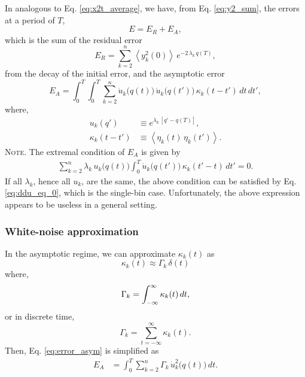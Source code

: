 \documentclass[reprint, floatfix]{revtex4-1}
\newcommand{\note}[1]{{\color{DarkGreen}\footnotesize \textsc{Note.} #1}}
\newcommand{\Err}{E}
\begin{document}
In analogous to Eq. \eqref{eq:x2t_average},
we have, from Eq. \eqref{eq:y2_sum},
the errors at a period of $T$,
%
\begin{equation}
  \Err
  =
  \Err_R + \Err_A,
  \label{eq:error_split}
\end{equation}
%
which is the sum of the residual error
%
\begin{equation}
  \Err_R
  =
  \sum_{k = 2}^n
    \left\langle y_k^2(0) \right\rangle \,
    e^{ - 2 \, \lambda_k  \, q(T) },
  \label{eq:error_res}
\end{equation}
%
from the decay of the initial error,
and the asymptotic error
\begin{equation}
  \Err_A
  =
  \int_0^T \int_0^T
  \sum_{k = 2}^n
    \dot u_k\bigl( q(t) \bigr) \,
    \dot u_k\bigl( q(t') \bigr) \,
    \kappa_k(t - t') \, dt \, dt',
  \label{eq:error_asym}
\end{equation}
%
where,
\begin{align*}
  u_k(q')
  &\equiv
  e^{\lambda_k \, [q' - q(T)]},
  \\
  \kappa_k(t - t')
  &\equiv
  \left\langle
    \eta_k(t) \, \eta_k(t')
  \right\rangle.
\end{align*}
%
\note{The extremal condition of $\Err_A$ is given by
%
\begin{align}
\sum_{k = 2}^n
\lambda_k \, u_k\bigl( q(t) \bigr)
\int_0^T
  \ddot u_k \bigl( q(t') \bigr) \,
  \kappa_k(t' - t) \, dt' = 0.
\label{eq:optimal_mbin}
\end{align}
%
If all $\lambda_k$, hence all $u_k$, are the same,
the above condition can be satisfied
by Eq. \eqref{eq:ddu_eq_0},
which is the single-bin case.
%
Unfortunately, the above expression
appears to be useless in a general setting.
}



\subsubsection{White-noise approximation}



In the asymptotic regime,
we can approximate $\kappa_k(t)$ as
%
\begin{equation}
  \kappa_k(t) \approx \Gamma_k \, \delta(t)
  \label{eq:kappa_delta}
\end{equation}
%
where,
\begin{equation}
  \Gamma_k = \int_{-\infty}^\infty \kappa_k(t) \, dt,
  \notag
\end{equation}
or in discrete time,
\begin{equation}
  \Gamma_k = \sum_{t = -\infty}^\infty \kappa_k(t).
  \label{eq:Gamma_sum}
\end{equation}
%
Then, Eq. \eqref{eq:error_asym} is simplified as
%
\begin{align}
  \Err_A
  &=
  \int_0^T
  \sum_{k = 2}^n
  \Gamma_k \, \dot u_k^2\bigl( q(t) \bigr) \, dt.
  \label{eq:error_asym1}
\end{align}
%
\end{document}
